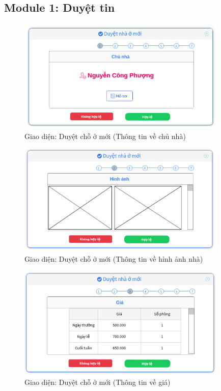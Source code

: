 \subsection{Module 1: Duyệt tin}
\begin{figure}[H]
	\centering
	\includegraphics[width=10cm]{Image/uiTan1.png}
	\vspace{0.5cm}
	\caption{Giao diện: Duyệt chỗ ở mới (Thông tin về chủ nhà)}
\end{figure}

\begin{figure}[H]
	\centering
	\includegraphics[width=10cm]{Image/uiTan2.png}
	\vspace{0.5cm}
	\caption{Giao diện: Duyệt chỗ ở mới (Thông tin về hỉnh ảnh nhà)}
\end{figure}

\begin{figure}[H]
	\centering
	\includegraphics[width=10cm]{Image/uiTan3.png}
	\vspace{0.5cm}
	\caption{Giao diện: Duyệt chỗ ở mới (Thông tin về giá)}
\end{figure}

